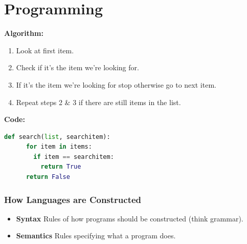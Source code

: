 \documentclass{beamer}
\begin{document}
%
%
\section{Programming}
\begin{frame}[fragile]
  \small 
  \begin{minipage}[t]{0.39\textwidth}
      \textbf{Algorithm:} \\
      \begin{enumerate}
        \item Look at first item.
        \item Check if it's the item we're looking for.
        \item If it's the item we're looking for stop otherwise go to next item.
        \item Repeat steps 2 \& 3 if there are still items in the list.
      \end{enumerate}
  \end{minipage}
  \begin{minipage}[t]{0.59\textwidth}
    \textbf{Code:}
    \begin{lstlisting}[language=Python]
    def search(list, searchitem):
      for item in items:
        if item == searchitem:
          return True
      return False
    \end{lstlisting}
    \hfill
  \end{minipage}
\end{frame}

%
%
\begin{frame}
  \frametitle{How Languages are Constructed}
  \begin{itemize}
    \item \textbf{Syntax} \textrightarrow Rules of how programs should be constructed (think grammar).
    \item \textbf{Semantics} \textrightarrow Rules specifying what a program does.
  \end{itemize}
\end{frame}
\end{document}
